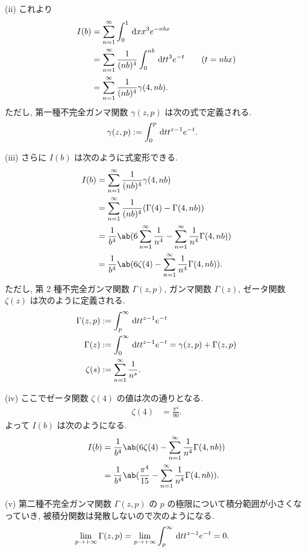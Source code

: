 \documentclass[uplatex,diffipdfmx,a4paper,11pt]{jlreq}
\theoremstyle{definition}
\begin{document}
(ii) これより
\begin{align}
  I(b) & = \sum_{n=1}^{\infty}\int_0^1\dl{x}x^3e^{-nbx}                                   \\
       & = \sum_{n=1}^{\infty}\frac{1}{(nb)^4}\int_0^{nb}\dl{t}t^3e^{-t} \qquad (t = nbx) \\
       & = \sum_{n=1}^{\infty}\frac{1}{(nb)^4}\gamma(4, nb).
\end{align}
ただし, 第一種不完全ガンマ関数 $\gamma(z, p)$ は次の式で定義される.
\begin{align}
  \gamma(z, p) & := \int_0^p\dl{t}t^{z-1}e^{-t}.
\end{align}

(iii)
さらに $I(b)$ は次のように式変形できる.
\begin{align}
  I(b) & = \sum_{n=1}^{\infty}\frac{1}{(nb)^4}\gamma(4, nb)                                                    \\
       & = \sum_{n=1}^{\infty}\frac{1}{(nb)^4}(\Gamma(4) - \Gamma(4, nb))                                      \\
       & = \frac{1}{b^4}\ab(6\sum_{n=1}^{\infty}\frac{1}{n^4} - \sum_{n=1}^{\infty}\frac{1}{n^4}\Gamma(4, nb)) \\
       & = \frac{1}{b^4}\ab(6\zeta(4) - \sum_{n=1}^{\infty}\frac{1}{n^4}\Gamma(4, nb)).
\end{align}
ただし, 第 2 種不完全ガンマ関数 $\Gamma(z, p)$, ガンマ関数 $\Gamma(z)$, ゼータ関数 $\zeta(z)$ は次のように定義される.
\begin{align}
  \Gamma(z, p) & := \int_p^\infty\dl{t}t^{z-1}e^{-t}                               \\
  \Gamma(z)    & := \int_0^\infty\dl{t}t^{z-1}e^{-t} = \gamma(z, p) + \Gamma(z, p) \\
  \zeta(s)     & := \sum_{n=1}^{\infty}\frac{1}{n^s}.
\end{align}

(iv)
ここでゼータ関数 $\zeta(4)$ の値は次の通りとなる.
\begin{align}
  \zeta(4) & = \frac{\pi^4}{90}.
\end{align}
よって $I(b)$ は次のようになる.
\begin{align}
  I(b) & = \frac{1}{b^4}\ab(6\zeta(4) - \sum_{n=1}^{\infty}\frac{1}{n^4}\Gamma(4, nb))         \\
       & = \frac{1}{b^4}\ab(\frac{\pi^4}{15} - \sum_{n=1}^{\infty}\frac{1}{n^4}\Gamma(4, nb)).
\end{align}

(v) 第二種不完全ガンマ関数 $\Gamma(z,p)$ の $p$ の極限について積分範囲が小さくなっていき, 被積分関数は発散しないので次のようになる.
\begin{align}
  \lim_{p\to+\infty}\Gamma(z, p) & = \lim_{p\to+\infty}\int_p^\infty\dl{t}t^{z-1}e^{-t} = 0.
\end{align}
\end{document}
